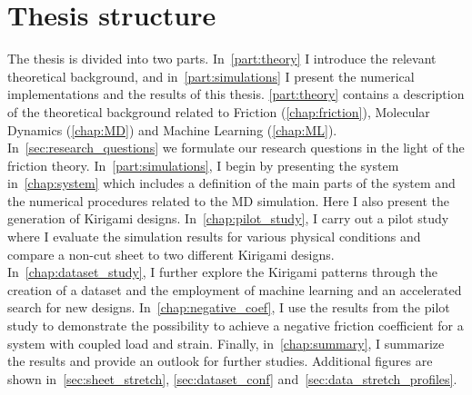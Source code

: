 \section{Thesis structure}
The thesis is divided into two parts. In~\cref{part:theory} I introduce the
relevant theoretical background, and in~\cref{part:simulations} I present the
numerical implementations and the results of this thesis. \cref{part:theory} contains a description of the theoretical background related
to Friction (\cref{chap:friction}), Molecular Dynamics (\cref{chap:MD}) and
Machine Learning (\cref{chap:ML}). In~\cref{sec:research_questions} we
formulate our research questions in the light of the friction theory.  In~\cref{part:simulations}, I begin by presenting the system in~\cref{chap:system} which includes a definition of the main parts of the system and the numerical procedures related to the \acrshort{MD} simulation. Here I also present the generation of Kirigami designs. In~\cref{chap:pilot_study}, I carry out a pilot
study where I evaluate the simulation results for
various physical conditions and compare a non-cut sheet to two different
Kirigami designs. In~\cref{chap:dataset_study}, I further explore the Kirigami patterns through the creation of a
dataset and the employment of machine learning and an accelerated search for new designs. In~\cref{chap:negative_coef}, I use
the results from the pilot study to demonstrate the possibility to achieve a
negative friction coefficient for a system with coupled load and strain. Finally, in~\cref{chap:summary}, I summarize the results and provide an outlook for further studies. Additional figures are shown
in~\cref{sec:sheet_stretch}, \cref{sec:dataset_conf} and~\cref{sec:data_stretch_profiles}. 


